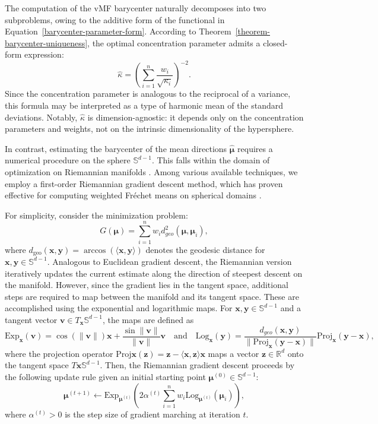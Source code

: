 \documentclass[10pt]{article}
\newcommand{\Exp}{\textrm{Exp}}
\newcommand{\Log}{\textrm{Log}}
\newcommand{\bfv}{\boldsymbol{v}}
\newcommand{\bfx}{\boldsymbol{x}}
\newcommand{\bfy}{\boldsymbol{y}}
\newcommand{\bfz}{\boldsymbol{z}}
\newcommand{\bfmu}{\boldsymbol{\mu}}
\newcommand{\bbR}{\mathbb{R}}
\newcommand{\bbS}{\mathbb{S}}
\newcommand{\Frechet}{Fr\'{e}chet }
\begin{document}
The computation of the vMF barycenter naturally decomposes into two subproblems, owing to the additive form of the functional in Equation~\eqref{barycenter-parameter-form}. According to Theorem~\ref{theorem-barycenter-uniqueness}, the optimal concentration parameter admits a closed-form expression: 
\begin{equation}\label{solution-optimal-concentration}
	\hat{\kappa} = \left(\sum_{i=1}^n \frac{w_i}{\sqrt{\kappa_i}}\right)^{-2}.
\end{equation} 
Since the concentration parameter is analogous to the reciprocal of a variance, this formula may be interpreted as a type of harmonic mean of the standard deviations. Notably, $\hat{\kappa}$ is dimension-agnostic: it depends only on the concentration parameters and weights, not on the intrinsic dimensionality of the hypersphere.


In contrast, estimating the barycenter of the mean directions $\hat{\bfmu}$ requires a numerical procedure on the sphere $\bbS^{d-1}$. This falls within the domain of optimization on Riemannian manifolds \citep{absil_2008_OptimizationAlgorithmsMatrix}. Among various available techniques, we employ a first-order Riemannian gradient descent method, which has proven effective for computing weighted \Frechet means on spherical domains \citep{you_2022_ParameterEstimationModelbased}.

For simplicity, consider the minimization problem: 
\begin{equation}\label{eq-subproblem-frechet-mean}
	G(\bfmu) = \sum_{i=1}^n w_i d_{geo}^2 (\bfmu, \bfmu_i),
\end{equation}
where $d_{\mathrm{geo}}(\bfx, \bfy) = \arccos(\langle \bfx, \bfy \rangle)$ denotes the geodesic distance for  $\bfx, \bfy \in \bbS^{d-1}$. Analogous to Euclidean gradient descent, the Riemannian version iteratively updates the current estimate along the direction of steepest descent on the manifold. However, since the gradient lies in the tangent space, additional steps are required to map between the manifold and its tangent space. These are accomplished using the exponential and logarithmic maps. For $\bfx, \bfy \in \bbS^{d-1}$ and a tangent vector $\bfv \in T_{\bfx}\bbS^{d-1}$, the maps are defined as \begin{equation}\label{eq-sphere-exponential-logarithmic-maps}
	\Exp_{\bfx} (\bfv) = \cos (\| \bfv \|) \bfx + \frac{\sin \|\bfv\|}{\|\bfv\|}\bfv \quad \textrm{and}\quad \Log_{\bfx} (\bfy) = \frac{d_{geo} (\bfx,\bfy)}{\| \textrm{Proj}_{\bfx}(\bfy-\bfx)\|} \textrm{Proj}_{\bfx} (\bfy-\bfx),
\end{equation} where the projection operator $\mathrm{Proj}{\bfx}(\bfz) = \bfz - \langle \bfx, \bfz \rangle \bfx$ maps a vector $\bfz \in \bbR^d$ onto the tangent space $T{\bfx} \bbS^{d-1}$. Then, the Riemannian gradient descent proceeds by the following update rule given an initial starting point $\bfmu^{(0)} \in \bbS^{d-1}$:
\begin{equation}\label{eq-geodesic-mean-update}
	\bfmu^{(t+1)} \leftarrow \Exp_{\bfmu^{(t)}} \left(2 \alpha^{(t)} \sum_{i=1}^n w_i \Log_{\bfmu^{(t)}} (\bfmu_i)\right),
\end{equation}
where $\alpha^{(t)} > 0$ is the step size of gradient marching at iteration $t$. 
\end{document}
